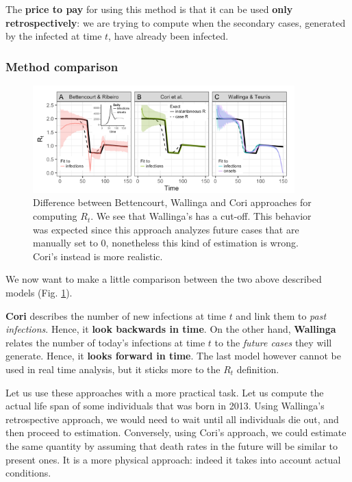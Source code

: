 \documentclass[../main/main.tex]{subfiles}
\begin{document}
The \textbf{price to pay} for using this method is that it can be used \textbf{only retrospectively}: we are trying to compute when the secondary cases, generated by the infected at time $t$, have already been infected.

\subsubsection{Method comparison}

\begin{figure}[h!]
\centering
\includegraphics[width=0.90\textwidth]{../lessons/image/22/image07.png}
\caption{\label{fig:22_07} Difference between Bettencourt, Wallinga and Cori approaches for computing $R_t$. We see that Wallinga's has a cut-off. This behavior was expected since this approach analyzes future cases that are manually set to 0, nonetheless this kind of estimation is wrong. Cori's instead is more realistic.}
\end{figure}

We now want to make a little comparison between the two above described models (Fig. \ref{fig:22_07}).


\textbf{Cori} describes the number of new infections at time $t$ and link them to \textit{past infections}. Hence, it \textbf{look backwards in time}. On the other hand, \textbf{Wallinga} relates the number of today's infections at time $t$ to the \textit{future cases} they will generate. Hence, it \textbf{looks forward in time}. The last model however cannot be used in real time analysis, but it sticks more to the $R_t$ definition.


Let us use these approaches with a more practical task. Let us compute the actual life span of some individuals that was born in 2013. Using Wallinga's retrospective approach, we would need to wait until all individuals die out, and then proceed to estimation. Conversely, using Cori's approach, we could estimate the same quantity by assuming that death rates in the future will be similar to present ones. It is a more physical approach: indeed it takes into account actual conditions.
\end{document}
